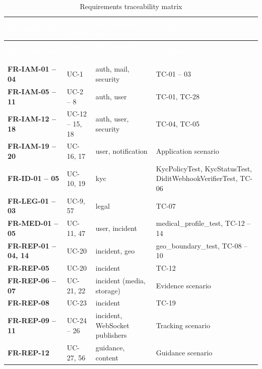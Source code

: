 {\tabfont\rowband
\begin{longtable}{@{}>{\raggedright\arraybackslash}p{}>{\raggedright\arraybackslash}p{}>{\raggedright\arraybackslash}p{}>{\raggedright\arraybackslash}p{}@{}}
\caption{Requirements traceability matrix}\label{tab:rtm}\\
\rowcolor{najdanavy}\textcolor{white}{\sffamily\bfseries\small Requirements} & \textcolor{white}{\sffamily\bfseries\small Use cases} & \textcolor{white}{\sffamily\bfseries\small Implemented in} & \textcolor{white}{\sffamily\bfseries\small Verified by}\\
\endfirsthead
\rowcolor{najdanavy}\textcolor{white}{\sffamily\bfseries\small Requirements} & \textcolor{white}{\sffamily\bfseries\small Use cases} & \textcolor{white}{\sffamily\bfseries\small Implemented in} & \textcolor{white}{\sffamily\bfseries\small Verified by}\\
\endhead
\bottomrule\endlastfoot
\textbf{FR-IAM-01 -- 04} & UC-1 & auth, mail, security & TC-01 -- 03\\
\textbf{FR-IAM-05 -- 11} & UC-2 -- 8 & auth, user & TC-01, TC-28\\
\textbf{FR-IAM-12 -- 18} & UC-12 -- 15, 18 & auth, user, security & TC-04, TC-05\\
\textbf{FR-IAM-19 -- 20} & UC-16, 17 & user, notification & Application scenario\\
\textbf{FR-ID-01 -- 05} & UC-10, 19 & kyc & KycPolicyTest, KycStatusTest, DiditWebhookVerifierTest, TC-06\\
\textbf{FR-LEG-01 -- 03} & UC-9, 57 & legal & TC-07\\
\textbf{FR-MED-01 -- 05} & UC-11, 47 & user, incident & medical\_\allowbreak{}profile\_\allowbreak{}test, TC-12 -- 14\\
\textbf{FR-REP-01 -- 04, 14} & UC-20 & incident, geo & geo\_\allowbreak{}boundary\_\allowbreak{}test, TC-08 -- 10\\
\textbf{FR-REP-05} & UC-20 & incident & TC-12\\
\textbf{FR-REP-06 -- 07} & UC-21, 22 & incident (media, storage) & Evidence scenario\\
\textbf{FR-REP-08} & UC-23 & incident & TC-19\\
\textbf{FR-REP-09 -- 11} & UC-24 -- 26 & incident, WebSocket publishers & Tracking scenario\\
\textbf{FR-REP-12} & UC-27, 56 & guidance, content & Guidance scenario\\

\end{longtable}}
